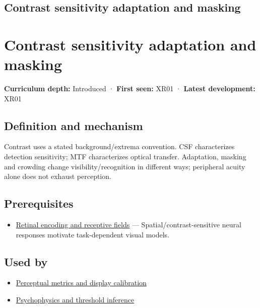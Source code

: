 \hypertarget{appendix-b3aa9e8e01ad}{}
\section*{Contrast sensitivity adaptation and masking}
\chapter{Contrast sensitivity adaptation and masking}\label{appendix-b3aa9e8e01ad-contrast-sensitivity-adaptation-and-masking}

\textbf{Curriculum depth:} Introduced · \textbf{First seen:} XR01 · \textbf{Latest development:} XR01

\section{Definition and mechanism}\label{appendix-b3aa9e8e01ad-definition-and-mechanism}

Contrast uses a stated background/extrema convention. CSF characterizes detection sensitivity; MTF characterizes optical transfer. Adaptation, masking and crowding change visibility/recognition in different ways; peripheral acuity alone does not exhaust perception.

\section{Prerequisites}\label{appendix-b3aa9e8e01ad-prerequisites}

\begin{itemize}
\tightlist
\item
  \hyperref[appendix-7281c15ac44a]{Retinal encoding and receptive fields} --- Spatial/contrast-sensitive neural responses motivate task-dependent visual models.
\end{itemize}

\section{Used by}\label{appendix-b3aa9e8e01ad-used-by}

\begin{itemize}
\tightlist
\item
  \hyperref[appendix-b2c1846508bf]{Perceptual metrics and display calibration}
\item
  \hyperref[appendix-1759f03e8ce7]{Psychophysics and threshold inference}
\end{itemize}

